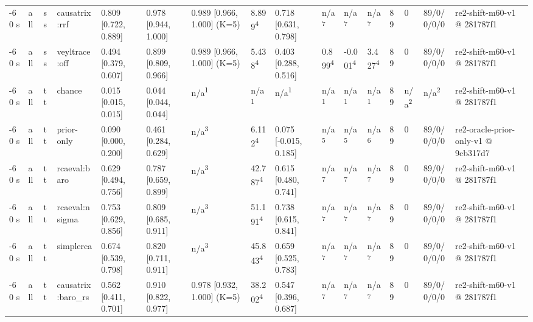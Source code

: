 \begin{table}[t]
\begin{tabular}{llllllllllllllll}
-60 s & all & ss & causatrix:rrf & 0.809 [0.722, 0.889] & 0.978 [0.944, 1.000] & 0.989 [0.966, 1.000] (K=5) & 8.899\textsuperscript{4} & 0.718 [0.631, 0.798] & n/a\textsuperscript{7} & n/a\textsuperscript{7} & n/a\textsuperscript{7} & 89 & 0 & 89/0/0/0/0 & re2-shift-m60-v1 @ 281787f1 \\
-60 s & all & ss & veyltrace:off & 0.494 [0.379, 0.607] & 0.899 [0.809, 0.966] & 0.989 [0.966, 1.000] (K=5) & 5.438\textsuperscript{4} & 0.403 [0.288, 0.516] & 0.899\textsuperscript{4} & -0.001\textsuperscript{4} & 3.427\textsuperscript{4} & 89 & 0 & 89/0/0/0/0 & re2-shift-m60-v1 @ 281787f1 \\
-60 s & all & tt & chance & 0.015 [0.015, 0.015] & 0.044 [0.044, 0.044] & n/a\textsuperscript{1} & n/a\textsuperscript{1} & n/a\textsuperscript{1} & n/a\textsuperscript{1} & n/a\textsuperscript{1} & n/a\textsuperscript{1} & 89 & n/a\textsuperscript{2} & n/a\textsuperscript{2} & re2-shift-m60-v1 @ 281787f1 \\
-60 s & all & tt & prior-only & 0.090 [0.000, 0.200] & 0.461 [0.284, 0.629] & n/a\textsuperscript{3} & 6.112\textsuperscript{4} & 0.075 [-0.015, 0.185] & n/a\textsuperscript{5} & n/a\textsuperscript{5} & n/a\textsuperscript{6} & 89 & 0 & 89/0/0/0/0 & re2-oracle-prior-only-v1 @ 9cb317d7 \\
-60 s & all & tt & rcaeval:baro & 0.629 [0.494, 0.756] & 0.787 [0.659, 0.899] & n/a\textsuperscript{3} & 42.787\textsuperscript{4} & 0.615 [0.480, 0.741] & n/a\textsuperscript{7} & n/a\textsuperscript{7} & n/a\textsuperscript{7} & 89 & 0 & 89/0/0/0/0 & re2-shift-m60-v1 @ 281787f1 \\
-60 s & all & tt & rcaeval:nsigma & 0.753 [0.629, 0.856] & 0.809 [0.685, 0.911] & n/a\textsuperscript{3} & 51.191\textsuperscript{4} & 0.738 [0.615, 0.841] & n/a\textsuperscript{7} & n/a\textsuperscript{7} & n/a\textsuperscript{7} & 89 & 0 & 89/0/0/0/0 & re2-shift-m60-v1 @ 281787f1 \\
-60 s & all & tt & simplerca & 0.674 [0.539, 0.798] & 0.820 [0.711, 0.911] & n/a\textsuperscript{3} & 45.843\textsuperscript{4} & 0.659 [0.525, 0.783] & n/a\textsuperscript{7} & n/a\textsuperscript{7} & n/a\textsuperscript{7} & 89 & 0 & 89/0/0/0/0 & re2-shift-m60-v1 @ 281787f1 \\
-60 s & all & tt & causatrix:baro\_rs & 0.562 [0.411, 0.701] & 0.910 [0.822, 0.977] & 0.978 [0.932, 1.000] (K=5) & 38.202\textsuperscript{4} & 0.547 [0.396, 0.687] & n/a\textsuperscript{7} & n/a\textsuperscript{7} & n/a\textsuperscript{7} & 89 & 0 & 89/0/0/0/0 & re2-shift-m60-v1 @ 281787f1 \\

\end{tabular}
\end{table}
